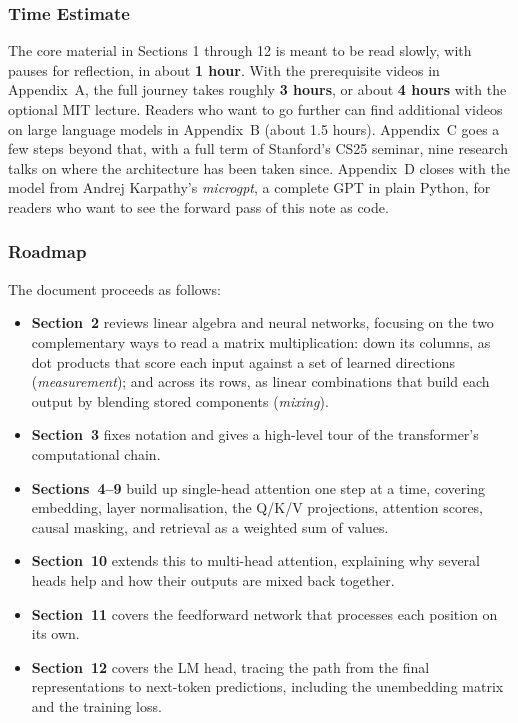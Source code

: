 \documentclass[11pt]{article}
\begin{document}
\subsubsection*{Time Estimate}

The core material in Sections 1 through 12 is meant to be read slowly, with pauses for reflection, in about \textbf{1 hour}. With the prerequisite videos in Appendix~A, the full journey takes roughly \textbf{3 hours}, or about \textbf{4 hours} with the optional MIT lecture. Readers who want to go further can find additional videos on large language models in Appendix~B (about 1.5 hours). Appendix~C goes a few steps beyond that, with a full term of Stanford's CS25 seminar, nine research talks on where the architecture has been taken since. Appendix~D closes with the model from Andrej Karpathy's \textit{microgpt}, a complete GPT in plain Python, for readers who want to see the forward pass of this note as code.

\subsubsection*{Roadmap}

The document proceeds as follows:
\begin{itemize}
    \item \textbf{Section~2} reviews linear algebra and neural networks, focusing on the two complementary ways to read a matrix multiplication: down its columns, as dot products that score each input against a set of learned directions (\emph{measurement}); and across its rows, as linear combinations that build each output by blending stored components (\emph{mixing}).
    \item \textbf{Section~3} fixes notation and gives a high-level tour of the transformer's computational chain.
    \item \textbf{Sections~4--9} build up single-head attention one step at a time, covering embedding, layer normalisation, the Q/K/V projections, attention scores, causal masking, and retrieval as a weighted sum of values.
    \item \textbf{Section~10} extends this to multi-head attention, explaining why several heads help and how their outputs are mixed back together.
    \item \textbf{Section~11} covers the feedforward network that processes each position on its own.
    \item \textbf{Section~12} covers the LM head, tracing the path from the final representations to next-token predictions, including the unembedding matrix and the training loss.
\end{itemize}
\newpage
\end{document}
